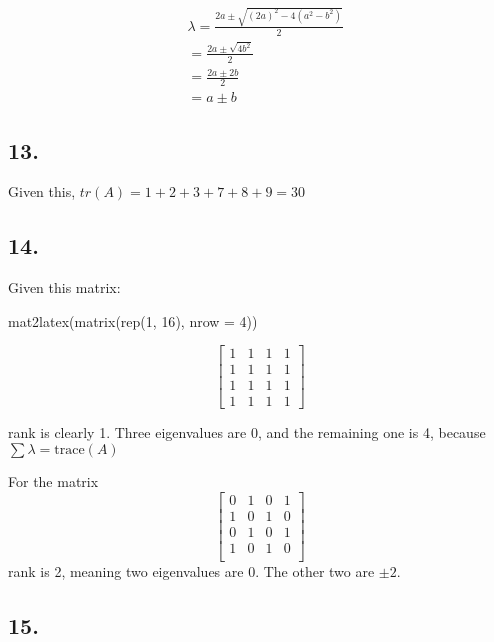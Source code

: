 \documentclass[
]{article}
\newenvironment{Shaded}{\begin{snugshade}}{\end{snugshade}}
\newcommand{\AttributeTok}[1]{\textcolor[rgb]{0.00,0.34,0.68}{#1}}
\newcommand{\DecValTok}[1]{\textcolor[rgb]{0.69,0.50,0.00}{#1}}
\newcommand{\FunctionTok}[1]{\textcolor[rgb]{0.39,0.29,0.61}{#1}}
\newcommand{\NormalTok}[1]{\textcolor[rgb]{0.12,0.11,0.11}{#1}}
\begin{document}
\[
  \begin{aligned}
    & \lambda = \frac{2a \pm \sqrt{(2a)^2 - 4(a^2 - b^2)}}{2}\\
    & =\frac{2a \pm \sqrt{4b^2}}{2}\\
    & = \frac{2a \pm 2b}{2}\\
    & = a \pm b
  \end{aligned}
\]

\hypertarget{section-11}{%
\subsection{13.}\label{section-11}}

Given this, \(tr(A) = 1 +2 +3 + 7 + 8 +9= 30\)

\hypertarget{section-12}{%
\subsection{14.}\label{section-12}}

Given this matrix:

\begin{Shaded}
\begin{Highlighting}[]
\FunctionTok{mat2latex}\NormalTok{(}\FunctionTok{matrix}\NormalTok{(}\FunctionTok{rep}\NormalTok{(}\DecValTok{1}\NormalTok{, }\DecValTok{16}\NormalTok{), }\AttributeTok{nrow =} \DecValTok{4}\NormalTok{))}
\end{Highlighting}
\end{Shaded}

\[
\begin{bmatrix}
1 & 1 & 1 & 1\\
1 & 1 & 1 & 1\\
1 & 1 & 1 & 1\\
1 & 1 & 1 & 1
\end{bmatrix}
\]

rank is clearly 1. Three eigenvalues are 0, and the remaining one is 4,
because \(\sum \lambda = \text{trace}(A)\)

For the matrix \[
\begin{bmatrix}
  0 & 1 & 0 & 1\\
  1 & 0 & 1 & 0\\
  0 & 1 & 0 & 1\\
  1 & 0 & 1 & 0\\
\end{bmatrix}
\] rank is 2, meaning two eigenvalues are 0. The other two are
\(\pm 2\).

\hypertarget{section-13}{%
\subsection{15.}\label{section-13}}
\end{document}
